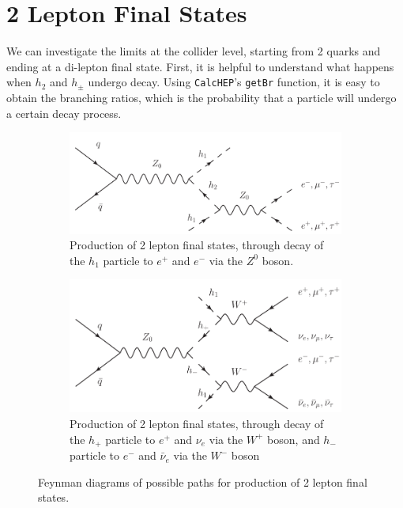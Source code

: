 \documentclass[12pt]{article}
\begin{document}
\section{2 Lepton Final States}
\label{sec:2lepton}
We can investigate the limits at the collider level, starting from 2 quarks and ending at a di-lepton final state. First, it is helpful to understand what happens when $h_2$ and $h_\pm$ undergo decay. Using \verb|CalcHEP|'s \verb|getBr| function, it is easy to obtain the branching ratios, which is the probability that a particle will undergo a certain decay process.
\begin{figure}[h]
    \centering
    \begin{subfigure}[b]{0.49\textwidth}
        \centering
        \includegraphics[width=\textwidth]{Feynmann_Diagrams/pp-h1h2.pdf}
        \caption{Production of 2 lepton final states, through decay of the $h_1$ particle to $e^+$ and $e^-$ via the $Z^0$ boson.}
        \label{fig:decay_h2}
    \end{subfigure}
    \hfill
    \begin{subfigure}[b]{0.49\textwidth}
        \centering
        \includegraphics[width=\textwidth]{Feynmann_Diagrams/pp-h+h-.pdf}
        \caption{Production of 2 lepton final states, through decay of the $h_+$ particle to $e^+$ and $\nu_e$ via the $W^+$ boson, and $h_-$ particle to $e^-$ and $\bar{\nu}_e$ via the $W^-$ boson}
        \label{fig:decay_h+}
    \end{subfigure}
    \caption{Feynman diagrams of possible paths for production of 2 lepton final states.}
    \label{fig:feynmann_diag}
\end{figure}
\end{document}
